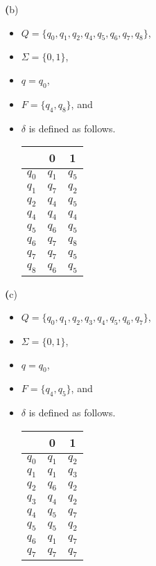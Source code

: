 \documentclass[11pt]{article}
\renewcommand{\part}[1] {{\vspace{0.15in}\noindent\textbf (#1)} \vspace{0.10in}}
\begin{document}
\part{b}
\begin{itemize}
	\item $Q = \{q_0, q_1, q_2, q_4, q_5, q_6, q_7, q_8\}$,	
	\item $\Sigma = \{0,1\}$,
	\item $q = q_0$,
	\item $F = \{q_4, q_8\}$, and
        \item $\delta$ is defined as follows. \\

\begin{tabular}{|c||c|c|}  \hline
      & 0 & 1 \\ \hline 
      $q_0$ & $q_1$ & $q_5$ \\ \hline 
      $q_1$ & $q_7$ & $q_2$ \\ \hline
      $q_2$ & $q_4$ & $q_5$ \\ \hline
      $q_4$ & $q_4$ & $q_4$ \\ \hline 
      $q_5$ & $q_6$ & $q_5$ \\ \hline 
      $q_6$ & $q_7$ & $q_8$ \\ \hline 
      $q_7$ & $q_7$ & $q_5$ \\ \hline 
      $q_8$ & $q_6$ & $q_5$ \\ \hline 
\end{tabular}
\end{itemize}

\part{c}
\begin{itemize}
	\item $Q = \{q_0, q_1, q_2, q_3, q_4, q_5, q_6, q_7\}$,	
	\item $\Sigma = \{0,1\}$,
	\item $q = q_0$,
	\item $F = \{q_4, q_5\}$, and
        \item $\delta$ is defined as follows. \\

\begin{tabular}{|c||c|c|}  \hline
      & 0 & 1 \\ \hline 
      $q_0$ & $q_1$ & $q_2$ \\ \hline 
      $q_1$ & $q_1$ & $q_3$ \\ \hline
      $q_2$ & $q_6$ & $q_2$ \\ \hline
      $q_3$ & $q_4$ & $q_2$ \\ \hline 
      $q_4$ & $q_5$ & $q_7$ \\ \hline 
      $q_5$ & $q_5$ & $q_2$ \\ \hline 
      $q_6$ & $q_1$ & $q_7$ \\ \hline 
      $q_7$ & $q_7$ & $q_7$ \\ \hline 
\end{tabular}

\end{itemize}
\end{document}

